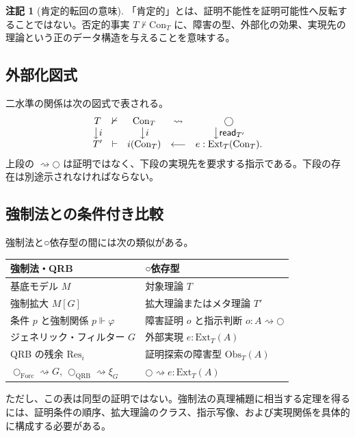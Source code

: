 \documentclass[a4paper,11pt]{ltjsarticle}
\theoremstyle{definition}
\newtheorem{remark}[definition]{注記}
\theoremstyle{plain}
\newcommand{\dfix}{\bigcirc}
\newcommand{\Obs}{\mathrm{Obs}}
\newcommand{\Ext}{\mathrm{Ext}}
\newcommand{\Con}{\mathrm{Con}}
\newcommand{\QRB}{\mathrm{QRB}}
\newcommand{\Forc}{\mathrm{Forc}}
\newcommand{\Res}{\mathrm{Res}}
\begin{document}
\begin{remark}[肯定的転回の意味]
「肯定的」とは、証明不能性を証明可能性へ反転することではない。否定的事実 $T\nvdash\Con_T$ に、障害の型、外部化の効果、実現先の理論という正のデータ構造を与えることを意味する。
\end{remark}

\subsection{外部化図式}

二水準の関係は次の図式で表される。
\[
\begin{array}{ccccc}
T & \nvdash & \Con_T
  & \rightsquigarrow & \dfix \\
\big\downarrow i && \big\downarrow i && \big\downarrow\mathsf{read}_{T'} \\
T' & \vdash & i(\Con_T)
  & \longleftarrow & e:\Ext_T(\Con_T).
\end{array}
\]
上段の $\rightsquigarrow\dfix$ は証明ではなく、下段の実現先を要求する指示である。下段の存在は別途示されなければならない。

\subsection{強制法との条件付き比較}

強制法と○依存型の間には次の類似がある。
\begin{center}
\begin{tabular}{>{\raggedright\arraybackslash}p{} >{\raggedright\arraybackslash}p{}}
\toprule
強制法・QRB & ○依存型 \\
\midrule
基底モデル $M$ & 対象理論 $T$ \\
強制拡大 $M[G]$ & 拡大理論またはメタ理論 $T'$ \\
条件 $p$ と強制関係 $p\Vdash\varphi$ & 障害証明 $o$ と指示判断 $o:A\rightsquigarrow\dfix$ \\
ジェネリック・フィルター $G$ & 外部実現 $e:\Ext_T(A)$ \\
QRB の残余 $\Res_i$ & 証明探索の障害型 $\Obs_T(A)$ \\
$\dfix_{\Forc}\rightsquigarrow G$, $\dfix_{\QRB}\rightsquigarrow\xi_G$ & $\dfix\rightsquigarrow e:\Ext_T(A)$ \\
\bottomrule
\end{tabular}
\end{center}

ただし、この表は同型の証明ではない。強制法の真理補題に相当する定理を得るには、証明条件の順序、拡大理論のクラス、指示写像、および実現関係を具体的に構成する必要がある。
\end{document}
